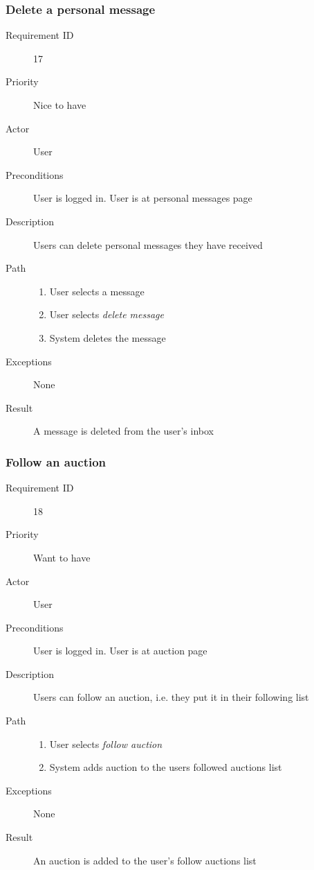 		\subsubsection{Delete a personal message}
			\begin{description}
				\item[Requirement ID] 17
				\item[Priority] Nice to have
				\item[Actor] User
				\item[Preconditions] User is logged in. User is at personal messages page
				\item[Description] Users can delete personal messages they have received
				\item[Path]
 					\begin{enumerate}
						\item User selects a message
						\item User selects \emph{delete message}
						\item System deletes the message
					\end{enumerate}
				\item[Exceptions] None
				\item[Result] A message is deleted from the user's inbox
			\end{description}
		\subsubsection{Follow an auction}
			\begin{description}
				\item[Requirement ID] 18
				\item[Priority] Want to have
				\item[Actor] User
				\item[Preconditions] User is logged in. User is at auction page
				\item[Description] Users can follow an auction, i.e. they put it in their following list
				\item[Path]
 					\begin{enumerate}
						\item User selects \emph{follow auction}
						\item System adds auction to the users followed auctions list
					\end{enumerate}
				\item[Exceptions] None
				\item[Result] An auction is added to the user's follow auctions list
			\end{description}
